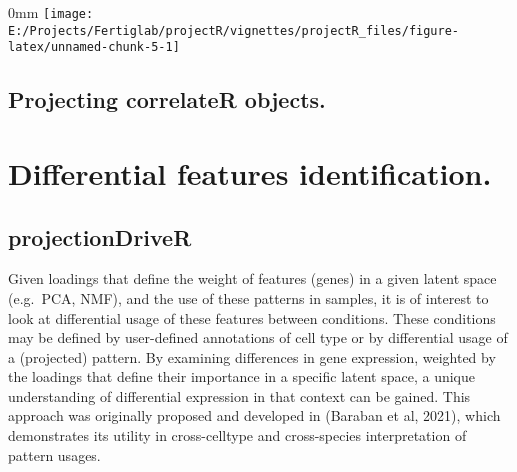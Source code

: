 \documentclass[]{article}
\newcommand{\hlnum}[1]{\textcolor[rgb]{0.816,0.125,0.439}{#1}}%
\newcommand{\hlstr}[1]{\textcolor[rgb]{0.251,0.627,0.251}{#1}}%
\newcommand{\hlcom}[1]{\textcolor[rgb]{0.502,0.502,0.502}{\textit{#1}}}%
\newcommand{\hlopt}[1]{\textcolor[rgb]{0,0,0}{#1}}%
\newcommand{\hlstd}[1]{\textcolor[rgb]{0.251,0.251,0.251}{#1}}%
\newcommand{\hlkwc}[1]{\textcolor[rgb]{0.251,0.251,0.251}{#1}}%
\newcommand{\hlkwd}[1]{\textcolor[rgb]{0.878,0.439,0.125}{#1}}%
\newenvironment{Shaded}{\begin{myshaded}}{\end{myshaded}}
\newcommand{\KeywordTok}[1]{\hlkwd{#1}}
\newcommand{\DataTypeTok}[1]{\hlkwc{#1}}
\newcommand{\DecValTok}[1]{\hlnum{#1}}
\newcommand{\StringTok}[1]{\hlstr{#1}}
\newcommand{\CommentTok}[1]{\hlcom{#1}}
\newcommand{\OtherTok}[1]{{#1}}
\newcommand{\OperatorTok}[1]{\hlopt{#1}}
\newcommand{\NormalTok}[1]{\hlstd{#1}}
\begin{document}
\begin{adjustwidth}{\fltoffset}{0mm}
\texttt{[image: E:/Projects/Fertiglab/projectR/vignettes/projectR\_files/figure-latex/unnamed-chunk-5-1]} \end{adjustwidth}

\hypertarget{projecting-correlater-objects.}{%
\subsection{Projecting correlateR objects.}\label{projecting-correlater-objects.}}

\begin{Shaded}
\end{Shaded}

\hypertarget{differential-features-identification.}{%
\section{Differential features identification.}\label{differential-features-identification.}}

\hypertarget{projectiondriver}{%
\subsection{projectionDriveR}\label{projectiondriver}}

Given loadings that define the weight of features (genes) in a given latent space (e.g.~PCA, NMF), and the use of these patterns in samples, it is of interest to look at differential usage of these features between conditions. These conditions may be defined by user-defined annotations of cell type or by differential usage of a (projected) pattern. By examining differences in gene expression, weighted by the loadings that define their importance in a specific latent space, a unique understanding of differential expression in that context can be gained. This approach was originally proposed and developed in (Baraban et al, 2021), which demonstrates its utility in cross-celltype and cross-species interpretation of pattern usages.
\end{document}
